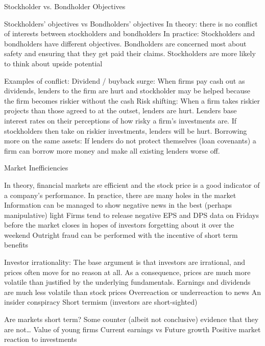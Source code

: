\documentclass[10pt]{article}
\begin{document}
    \begin{core}{Stockholder vs. Bondholder Objectives}

      Stockholders’ objectives vs Bondholders’ objectives
      In theory: there is no conflict of interests between stockholders and bondholders
      In practice: Stockholders and bondholders have different objectives. Bondholders are concerned most about safety and ensuring that they get paid their claims. Stockholders are more likely to think about upside potential

      Examples of conflict:
      Dividend / buyback surge: When firms pay cash out as dividends, lenders to the firm are hurt and stockholder may be helped because the firm becomes riskier without the cash
      Risk shifting: When a firm takes riskier projects than those agreed to at the outset, lenders are hurt. Lenders base interest rates on their perceptions of how risky a firm’s investments are. If stockholders then take on riskier investments, lenders will be hurt.
      Borrowing more on the same assets: If lenders do not protect themselves (loan covenants) a firm can borrow more money and make all existing lenders worse off.

    \end{core}

    \begin{core}{Market Inefficiencies}

      In theory, financial markets are efficient and the stock price is a good indicator of a company’s performance. In practice, there are many holes in the market
      Information can be managed to show negative news in the best (perhaps manipulative) light
      Firms tend to release negative EPS and DPS data on Fridays before the market closes in hopes of investors forgetting about it over the weekend
      Outright fraud can be performed with the incentive of short term benefits 

      Investor irrationality: The base argument is that investors are irrational, and prices often move for no reason at all. As a consequence, prices are much more volatile than justified by the underlying fundamentals. Earnings and dividends are much less volatile than stock prices
      Overreaction or underreaction to news
      An insider conspiracy
      Short termism (investors are short-sighted)

      Are markets short term? Some counter (albeit not conclusive) evidence that they are not…
      Value of young firms
      Current earnings vs Future growth
      Positive market reaction to investments

    \end{core}
\end{document}
